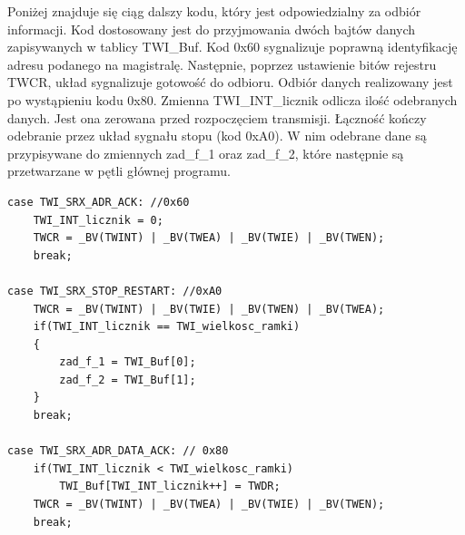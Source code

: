 Poniżej znajduje się ciąg dalszy kodu, który jest odpowiedzialny za odbiór informacji. Kod dostosowany jest do przyjmowania dwóch bajtów danych zapisywanych w tablicy TWI\_Buf. Kod 0x60 sygnalizuje poprawną identyfikację adresu podanego na magistralę. Następnie, poprzez ustawienie bitów rejestru TWCR, układ sygnalizuje gotowość do odbioru. Odbiór danych realizowany jest po wystąpieniu kodu 0x80. Zmienna TWI\_INT\_licznik odlicza ilość odebranych danych. Jest ona zerowana przed rozpoczęciem transmisji. Łączność kończy odebranie przez układ sygnału stopu (kod 0xA0). W nim odebrane dane są przypisywane do zmiennych zad\_f\_1 oraz zad\_f\_2, które następnie są przetwarzane w pętli głównej programu.
\begin{lstlisting}[caption={Fragment przerwania obsługującego komunikację TWI, który jest odpowiedzialny za odbiór informacji}]
case TWI_SRX_ADR_ACK: //0x60
	TWI_INT_licznik = 0;
	TWCR = _BV(TWINT) | _BV(TWEA) | _BV(TWIE) | _BV(TWEN);
	break;
	
case TWI_SRX_STOP_RESTART: //0xA0
	TWCR = _BV(TWINT) | _BV(TWIE) | _BV(TWEN) | _BV(TWEA);
	if(TWI_INT_licznik == TWI_wielkosc_ramki)
	{
		zad_f_1 = TWI_Buf[0];
		zad_f_2 = TWI_Buf[1];
	}
	break;

case TWI_SRX_ADR_DATA_ACK: // 0x80
	if(TWI_INT_licznik < TWI_wielkosc_ramki)
		TWI_Buf[TWI_INT_licznik++] = TWDR;
	TWCR = _BV(TWINT) | _BV(TWEA) | _BV(TWIE) | _BV(TWEN);
	break;
\end{lstlisting}

